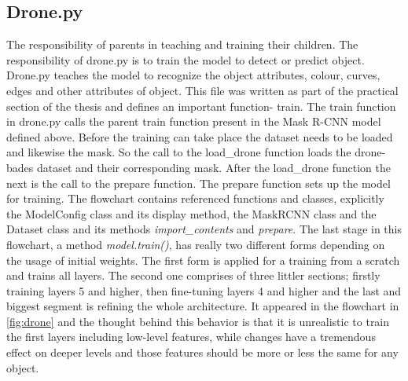 \subsection{Drone.py}
The responsibility of parents in teaching and training their children. The responsibility of drone.py is to train the model to detect or 
predict object. Drone.py teaches the model to recognize the object attributes, colour, curves, edges and other attributes of object. 
This file was written as part of the practical section of the thesis and defines an important function- train. 
The train function in drone.py calls the parent train function present in the Mask R-CNN model defined above.  Before the training can take place the dataset needs to be loaded and likewise the mask. So the call to the load\_drone function loads the drone-bades dataset and their corresponding mask.   
After the load\_drone function the next is the call to the prepare function. The prepare function sets up the model for training.
The flowchart contains referenced functions and classes, explicitly the ModelConfig class and its display method, the MaskRCNN 
class and the Dataset class and its methods \textit{import\_contents} and \textit{prepare}. 
The last stage in this flowchart, a method\textit{ model.train()}, has really two different forms depending on the usage of initial weights. The first form is applied for a training from a scratch and trains all layers. The second one comprises of three littler sections; firstly training layers 5 and higher, then fine-tuning layers 4 and higher and the last and biggest segment is refining the whole architecture. It appeared in the flowchart in \ref{fig:drone} and the thought behind this behavior is that it is unrealistic to train the first layers including low-level features, while changes have a tremendous effect on deeper levels and those features should be more or less the same
for any object.
\clearpage
